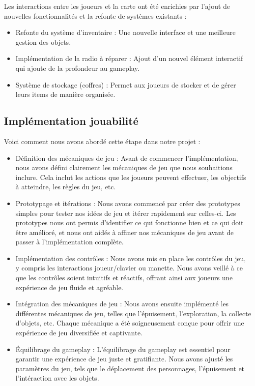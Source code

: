 \documentclass[
	article,			%
	11pt,				%
	oneside,			%
	a4paper,			%
	chapter=TITLE,
	french,			%
	sumario=tradicional
	]{base_nt}
\begin{document}
Les interactions entre les joueurs et la carte ont été enrichies par l'ajout de nouvelles fonctionnalités et la refonte de systèmes existants :

\begin{itemize}
    \item Refonte du système d'inventaire : Une nouvelle interface et une meilleure gestion des objets.
    \item Implémentation de la radio à réparer : Ajout d'un nouvel élément interactif qui ajoute de la profondeur au gameplay.
    \item Système de stockage (coffres) : Permet aux joueurs de stocker et de gérer leurs items de manière organisée.
\end{itemize}

\newpage

\subsection{Implémentation jouabilité}

Voici comment nous avons abordé cette étape dans notre projet :

\begin{itemize}
    \item Définition des mécaniques de jeu : Avant de commencer l'implémentation, nous avons défini clairement les mécaniques de jeu que nous souhaitions inclure. Cela inclut les actions que les joueurs peuvent effectuer, les objectifs à atteindre, les règles du jeu, etc.
    \item Prototypage et itérations : Nous avons commencé par créer des prototypes simples pour tester nos idées de jeu et itérer rapidement sur celles-ci. Les prototypes nous ont permis d'identifier ce qui fonctionne bien et ce qui doit être amélioré, et nous ont aidés à affiner nos mécaniques de jeu avant de passer à l'implémentation complète.
    \item Implémentation des contrôles : Nous avons mis en place les contrôles du jeu, y compris les interactions joueur/clavier ou manette. Nous avons veillé à ce que les contrôles soient intuitifs et réactifs, offrant ainsi aux joueurs une expérience de jeu fluide et agréable.
    \item Intégration des mécaniques de jeu : Nous avons ensuite implémenté les différentes mécaniques de jeu, telles que l'épuisement, l'exploration, la collecte d'objets, etc. Chaque mécanique a été soigneusement conçue pour offrir une expérience de jeu diversifiée et captivante.
    \item Équilibrage du gameplay : L'équilibrage du gameplay est essentiel pour garantir une expérience de jeu juste et gratifiante. Nous avons ajusté les paramètres du jeu, tels que le déplacement des personnages, l'épuisement et l'intéraction avec les objets.
\end{itemize}
\end{document}
